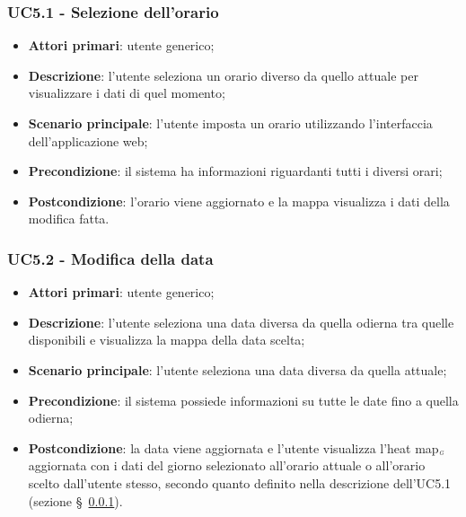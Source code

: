 \subsubsection{UC5.1 - Selezione dell’orario}\label{CasiDUsoCasiDUsoTraUnUtenteEIlFrontEndElencoCasiDUsoUC51SelezioneDellOrario}
\begin{itemize}
	\item \textbf{Attori primari}: utente generico;
	\item \textbf{Descrizione}: l’utente seleziona un orario diverso da quello attuale per visualizzare i dati di quel momento;
	\item \textbf{Scenario principale}: l’utente imposta un orario utilizzando l’interfaccia dell’applicazione web;
	\item \textbf{Precondizione}: il sistema ha informazioni riguardanti tutti i diversi orari; %
	\item \textbf{Postcondizione}:  l’orario viene aggiornato e la mappa visualizza i dati della modifica fatta.
\end{itemize}

\subsubsection{UC5.2 - Modifica della data}\label{CasiDUsoCasiDUsoTraUnUtenteEIlFrontEndElencoCasiDUsoUC52ModificaDellaData}
\begin{itemize}
	\item \textbf{Attori primari}: utente generico;
	\item \textbf{Descrizione}: l’utente seleziona una data diversa da quella odierna tra quelle disponibili e visualizza la mappa della data scelta;
	\item \textbf{Scenario principale}: l’utente seleziona una data diversa da quella attuale;
	\item \textbf{Precondizione}: il sistema possiede informazioni su tutte le date fino a quella odierna;
	\item \textbf{Postcondizione}: la data viene aggiornata e l’utente visualizza l’heat map$_{\scaleto{G}{3pt}}$ aggiornata con i dati del giorno selezionato all’orario attuale o all’orario scelto dall’utente stesso, secondo quanto definito nella descrizione dell’UC5.1 (sezione \S~\ref{CasiDUsoCasiDUsoTraUnUtenteEIlFrontEndElencoCasiDUsoUC51SelezioneDellOrario}).
\end{itemize}

